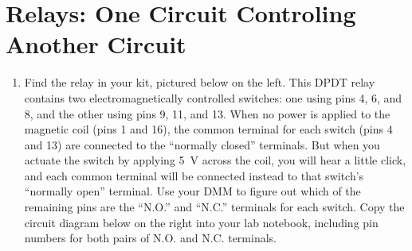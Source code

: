 \section{Relays: One Circuit Controling Another Circuit}
\label{lab_relays}


\bigskip

\begin{enumerate}[wide]

\item Find the relay in your kit, pictured below on the left.
This DPDT relay contains two electromagnetically controlled switches: one using pins 4, 6, and 8, and the other using pins 9, 11, and 13.  
When no power is applied to the magnetic coil (pins 1 and 16), the common terminal for each switch (pins 4 and 13) are connected to the ``normally closed'' terminals.  
But when you actuate the switch by applying 5~V across the coil, you will hear a little click, and each common terminal will be connected instead to that switch's ``normally open'' terminal.  
Use your DMM to figure out which of the remaining pins are the ``N.O.'' and ``N.C.'' terminals for each switch.  Copy the circuit diagram below on the right into your lab notebook, including pin numbers for both pairs of N.O. and N.C. terminals.


\end{enumerate}
